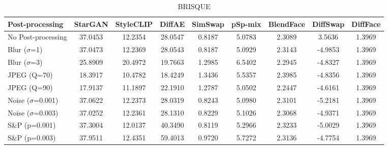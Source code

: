 \documentclass{article}
\begin{document}
\begin{table}[h!]
\begin{subtable}{\textwidth}
\caption{BRISQUE}
\centering
\scriptsize
\begin{tabular}{lcccccccc}
\toprule
\textbf{Post-processing} & StarGAN & StyleCLIP & DiffAE & SimSwap & pSp-mix & BlendFace & DiffSwap & DiffFace \\
\midrule
No Post-processing & 37.0453 & 12.2354 & 28.0547 & 0.8187 & 5.0783 & 2.3089 & 3.5636 & 1.3969 \\
\midrule
Blur ($\sigma$=1) & 37.0473 & 12.2369 & 28.0543 & 0.8187 & 5.0929 & 2.3143 & -4.9853 & 1.3969 \\
Blur ($\sigma$=3) & 25.8909 & 20.4972 & 19.7663 & 1.2985 & 6.5402 & 2.2945 & -4.8327 & 1.3969 \\
JPEG (Q=70) & 18.3917 & 10.4782 & 18.4249 & 1.3436 & 5.5357 & 2.3985 & -4.8356 & 1.3969\\
JPEG (Q=90) & 17.9137 & 11.1897 & 22.1910 & 1.2787 & 5.0502 & 2.2447 & -4.6161 & 1.3969\\
Noise ($\sigma$=0.001) & 37.0622 & 12.2373 & 28.0319 & 0.8243 & 5.0980 & 2.3101 & -5.2181 & 1.3969\\
Noise ($\sigma$=0.003) & 37.0252 & 12.2361 & 28.1310 & 0.8229 & 5.1026 & 2.3068 & -4.9371 & 1.3969\\
S\&P (p=0.001) & 37.3004 & 12.0137 & 40.3490 & 0.8119 & 5.2966 & 2.3233 & -5.0029 & 1.3969\\
S\&P (p=0.003) & 37.9511 & 12.4351 & 59.4013 & 0.9720 & 5.7272 & 2.3136 & -4.7754 & 1.3969\\
\bottomrule
\end{tabular}
\end{subtable}
\end{table}

\clearpage
\end{document}
